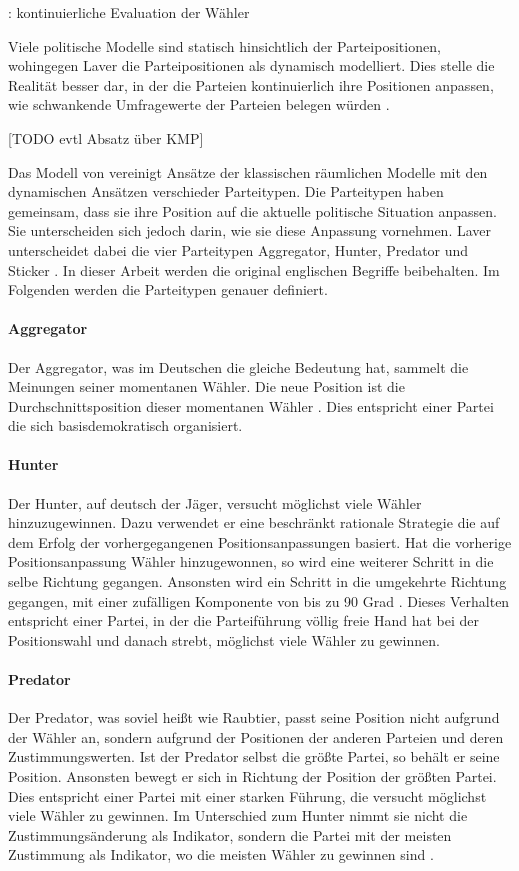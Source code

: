 \cite{laver2005policy}: kontinuierliche Evaluation der Wähler

Viele politische Modelle sind statisch hinsichtlich der Parteipositionen, wohingegen Laver die Parteipositionen als dynamisch modelliert. Dies stelle die Realität besser dar, in der die Parteien kontinuierlich ihre Positionen anpassen, wie schwankende Umfragewerte der Parteien belegen würden \citep[S.\,263-4]{laver2005policy}.

[TODO evtl Absatz über KMP]

Das Modell von \cite{laver2005policy} vereinigt Ansätze der klassischen räumlichen Modelle mit den dynamischen Ansätzen verschieder Parteitypen. Die Parteitypen haben gemeinsam, dass sie ihre Position auf die aktuelle politische Situation anpassen. Sie unterscheiden sich jedoch darin, wie sie diese Anpassung vornehmen. Laver unterscheidet dabei die vier Parteitypen Aggregator, Hunter, Predator und Sticker \citep[S.\,266-7]{laver2005policy}. In dieser Arbeit werden die original englischen Begriffe beibehalten. Im Folgenden werden die Parteitypen genauer definiert.

\paragraph{Aggregator} Der Aggregator, was im Deutschen die gleiche Bedeutung hat, sammelt die Meinungen seiner momentanen Wähler. Die neue Position ist die Durchschnittsposition dieser momentanen Wähler \citep[S.\,267]{laver2005policy}. Dies entspricht einer Partei die sich basisdemokratisch organisiert.

\paragraph{Hunter} Der Hunter, auf deutsch der Jäger, versucht möglichst viele Wähler hinzuzugewinnen. Dazu verwendet er eine beschränkt rationale Strategie die auf dem Erfolg der vorhergegangenen Positionsanpassungen basiert. Hat die vorherige Positionsanpassung Wähler hinzugewonnen, so wird eine weiterer Schritt in die selbe Richtung gegangen. Ansonsten wird ein Schritt in die umgekehrte Richtung gegangen, mit einer zufälligen Komponente von bis zu 90 Grad \citep[S.\,267]{laver2005policy}. Dieses Verhalten entspricht einer Partei, in der die Parteiführung völlig freie Hand hat bei der Positionswahl und danach strebt, möglichst viele Wähler zu gewinnen.

\paragraph{Predator} Der Predator, was soviel heißt wie Raubtier, passt seine Position nicht aufgrund der Wähler an, sondern aufgrund der Positionen der anderen Parteien und deren Zustimmungswerten. Ist der Predator selbst die größte Partei, so behält er seine Position. Ansonsten bewegt er sich in Richtung der Position der größten Partei. Dies entspricht einer Partei mit einer starken Führung, die versucht möglichst viele Wähler zu gewinnen. Im Unterschied zum Hunter nimmt sie nicht die Zustimmungsänderung als Indikator, sondern die Partei mit der meisten Zustimmung als Indikator, wo die meisten Wähler zu gewinnen sind \citep[S.\,267]{laver2005policy}.

